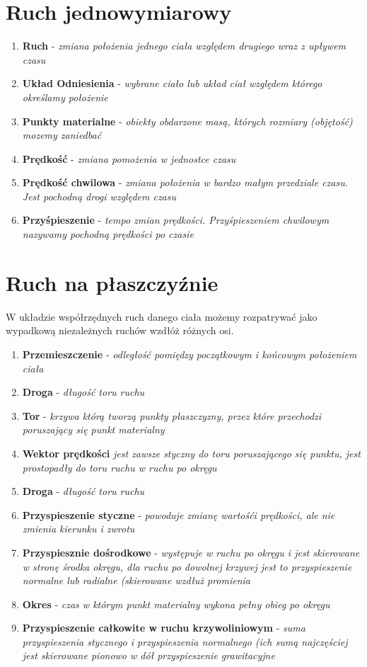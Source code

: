 \documentclass[12pt,twoside,a4paper]{book}
\begin{document}
\section{Ruch jednowymiarowy}
\begin{enumerate}[label=(\alph*)]
\item\textbf{Ruch} - \textit{zmiana położenia jednego ciała względem drugiego wraz z upływem czasu}
\item\textbf{Układ Odniesienia} - \textit{wybrane ciało lub układ ciał względem którego określamy położenie}
\item\textbf{Punkty materialne} - \textit{obiekty obdarzone masą, których rozmiary (objętość) mozemy zaniedbać}
\item\textbf{Prędkość} - \textit{zmiana pomożenia w jednostce czasu}
\item\textbf{Prędkość chwilowa} - \textit{zmiana położenia w bardzo małym przedziale czasu. Jest pochodną drogi względem czasu}
\item\textbf{Przyśpieszenie} - \textit{tempo zmian prędkości. Przyśpieszeniem chwilowym nazywamy pochodną prędkości po czasie}
\end{enumerate}

\section{Ruch na płaszczyźnie}
W układzie współrzędnych  ruch danego ciała możemy rozpatrywać jako wypadkową niezależnych ruchów wzdłóż różnych osi.
\begin{enumerate}[label=(\alph*)]
\item\textbf{Przemieszczenie} - \textit{odległość pomiędzy początkowym i końcowym położeniem ciała}
\item\textbf{Droga} - \textit{długość toru ruchu}
\item\textbf{Tor} - \textit{krzywa którą tworzą punkty płaszczyzny, przez które przechodzi poruszający się punkt materialny}
\item\textbf{Wektor prędkości} \textit{jest zawsze styczny do toru poruszającego się punktu, jest prostopadły do toru ruchu w ruchu po okręgu}
\item\textbf{Droga} - \textit{długość toru ruchu}
\item\textbf{Przyspieszenie styczne} - \textit{powoduje zmianę wartośći prędkości, ale nie zmienia kierunku i zwrotu}
\item\textbf{Przyspiesznie dośrodkowe} - \textit{występuje w ruchu po okręgu i jest skierowane w stronę środka okręgu, dla ruchu po dowolnej krzywej jest to przyspieszenie normalne lub radialne (skierowane wzdłuż promienia}
\item\textbf{Okres} - \textit{czas w którym punkt materialny wykona pełny obieg po okręgu}
\item\textbf{Przyspieszenie całkowite w ruchu krzywoliniowym} - \textit{suma przyspieszenia stycznego i przyspieszenia normalnego (ich sumą najczęściej jest skierowane pionowo w dół przyspieszenie grawitacyjne}
\end{enumerate}
\end{document}
